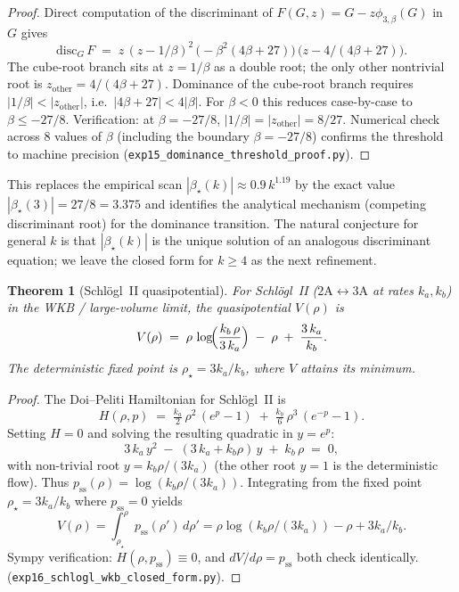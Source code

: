\documentclass[11pt,a4paper]{article}
\theoremstyle{plain}
\newtheorem{theorem}{Theorem}
\begin{document}
\begin{proof}
Direct computation of the discriminant of $F(G,z) = G - z\phi_{3,\beta}(G)$
in $G$ gives
\[
  \mathrm{disc}_{G}\,F \;=\; z\,(z - 1/\beta)^{2}\,\bigl(-\beta^{2}(4\beta+27)\bigr)\,
   \bigl(z - 4/(4\beta+27)\bigr).
\]
The cube-root branch sits at $z = 1/\beta$ as a double root; the only
other nontrivial root is $z_{\mathrm{other}} = 4/(4\beta+27)$.  Dominance
of the cube-root branch requires $|1/\beta| < |z_{\mathrm{other}}|$, i.e.\
$|4\beta + 27| < 4|\beta|$.  For $\beta < 0$ this reduces case-by-case to
$\beta \leq -27/8$.  Verification: at $\beta = -27/8$, $|1/\beta| =
|z_{\mathrm{other}}| = 8/27$.  Numerical check across 8 values of $\beta$
(including the boundary $\beta = -27/8$) confirms the threshold to
machine precision (\texttt{exp15\_dominance\_threshold\_proof.py}).
\end{proof}

This replaces the empirical scan $|\beta_{\star}(k)| \approx 0.9\,k^{1.19}$
by the exact value $|\beta_{\star}(3)| = 27/8 = 3.375$ and identifies the
analytical mechanism (competing discriminant root) for the dominance
transition.  The natural conjecture for general $k$ is that
$|\beta_{\star}(k)|$ is the unique solution of an analogous discriminant
equation; we leave the closed form for $k \geq 4$ as the next refinement.

\begin{theorem}[Schl\"ogl~II quasipotential]\label{thm:schlogl}
For Schl\"ogl~II ($2\mathrm{A} \leftrightarrow 3\mathrm{A}$ at rates
$k_{a}, k_{b}$) in the WKB / large-volume limit, the quasipotential
$V(\rho)$ is
\[
  V(\rho) \;=\; \rho\,\log\!\Bigl(\frac{k_{b}\,\rho}{3\,k_{a}}\Bigr) \;-\;
  \rho \;+\; \frac{3\,k_{a}}{k_{b}}.
\]
The deterministic fixed point is $\rho_{\star} = 3 k_{a}/k_{b}$, where
$V$ attains its minimum.
\end{theorem}

\begin{proof}
The Doi--Peliti Hamiltonian for Schl\"ogl~II is
\[
  H(\rho, p) \;=\; \tfrac{k_{a}}{2}\,\rho^{2}\,(e^{p} - 1) \;+\;
  \tfrac{k_{b}}{6}\,\rho^{3}\,(e^{-p} - 1).
\]
Setting $H = 0$ and solving the resulting quadratic in $y = e^{p}$:
\[
  3\,k_{a}\,y^{2} \;-\; (3\,k_{a} + k_{b}\rho)\,y \;+\; k_{b}\,\rho \;=\; 0,
\]
with non-trivial root $y = k_{b}\rho/(3 k_{a})$ (the other root $y = 1$
is the deterministic flow).  Thus $p_{\mathrm{ss}}(\rho) = \log(k_{b}
\rho/(3 k_{a}))$.  Integrating from the fixed point $\rho_{\star} =
3 k_{a}/k_{b}$ where $p_{\mathrm{ss}} = 0$ yields
\[
  V(\rho) = \int_{\rho_{\star}}^{\rho} p_{\mathrm{ss}}(\rho')\,d\rho'
         = \rho\log(k_{b}\rho/(3k_{a})) - \rho + 3 k_{a}/k_{b}.
\]
Sympy verification: $H(\rho, p_{\mathrm{ss}}) \equiv 0$, and $dV/d\rho =
p_{\mathrm{ss}}$ both check identically.
(\texttt{exp16\_schlogl\_wkb\_closed\_form.py}).
\end{proof}
\end{document}
